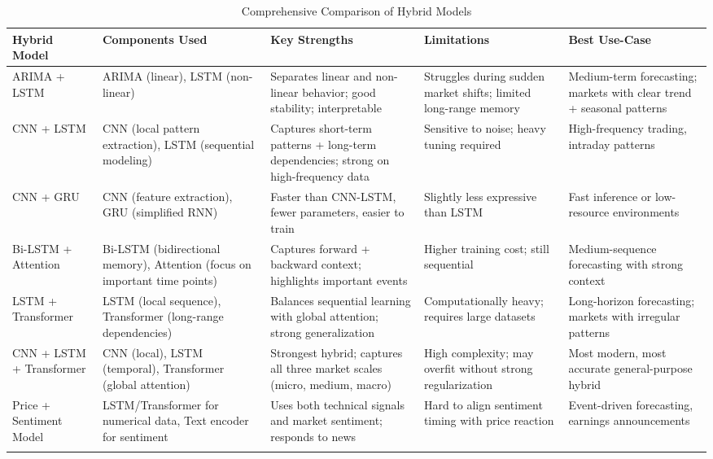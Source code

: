 \begin{table}[htbp]
\centering
\caption{Comprehensive Comparison of Hybrid Models}
\label{tab:hybrid_comparison}
\small
\begin{tabular}{@{}p{2.5cm}p{2.5cm}p{3cm}p{2.5cm}p{2.5cm}@{}}
\toprule
\textbf{Hybrid Model} & \textbf{Components Used} & \textbf{Key Strengths} & \textbf{Limitations} & \textbf{Best Use-Case} \\ \midrule

ARIMA + LSTM & ARIMA (linear), LSTM (non-linear) & Separates linear and non-linear behavior; good stability; interpretable & Struggles during sudden market shifts; limited long-range memory & Medium-term forecasting; markets with clear trend + seasonal patterns \\
\addlinespace

CNN + LSTM & CNN (local pattern extraction), LSTM (sequential modeling) & Captures short-term patterns + long-term dependencies; strong on high-frequency data & Sensitive to noise; heavy tuning required & High-frequency trading, intraday patterns \\
\addlinespace

CNN + GRU & CNN (feature extraction), GRU (simplified RNN) & Faster than CNN-LSTM, fewer parameters, easier to train & Slightly less expressive than LSTM & Fast inference or low-resource environments \\
\addlinespace

Bi-LSTM + Attention & Bi-LSTM (bidirectional memory), Attention (focus on important time points) & Captures forward + backward context; highlights important events & Higher training cost; still sequential & Medium-sequence forecasting with strong context \\
\addlinespace

LSTM + Transformer & LSTM (local sequence), Transformer (long-range dependencies) & Balances sequential learning with global attention; strong generalization & Computationally heavy; requires large datasets & Long-horizon forecasting; markets with irregular patterns \\
\addlinespace

CNN + LSTM + Transformer & CNN (local), LSTM (temporal), Transformer (global attention) & Strongest hybrid; captures all three market scales (micro, medium, macro) & High complexity; may overfit without strong regularization & Most modern, most accurate general-purpose hybrid \\
\addlinespace

Price + Sentiment Model & LSTM/Transformer for numerical data, Text encoder for sentiment & Uses both technical signals and market sentiment; responds to news & Hard to align sentiment timing with price reaction & Event-driven forecasting, earnings announcements \\
\addlinespace


\end{tabular}
\end{table}
